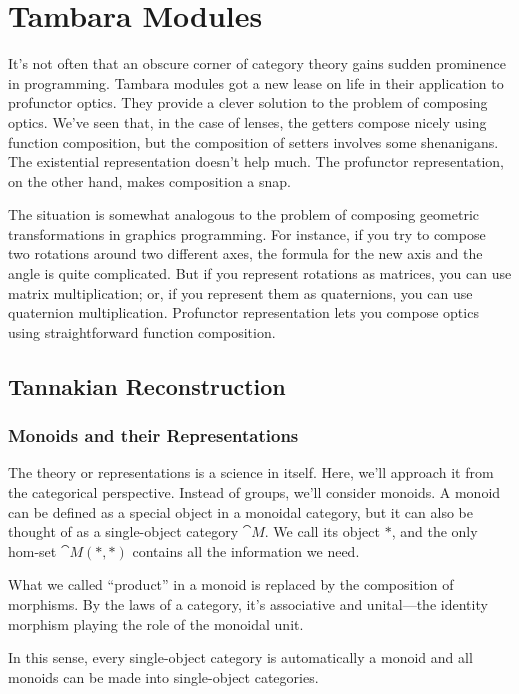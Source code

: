 \documentclass[DaoFP]{subfiles}
\begin{document}
\setcounter{chapter}{18}

\chapter{Tambara Modules}

It's not often that an obscure corner of category theory gains sudden prominence in programming. Tambara modules got a new lease on life in their application to profunctor optics. They provide a clever solution to the problem of composing optics. We've seen that, in the case of lenses, the getters compose nicely using function composition, but the composition of setters involves some shenanigans. The existential representation doesn't help much. The profunctor representation, on the other hand, makes composition a snap. 

The situation is somewhat analogous to the problem of composing geometric transformations in graphics programming. For instance, if you try to compose two rotations around two different axes, the formula for the new axis and the angle is quite complicated. But if you represent rotations as matrices, you can use matrix multiplication; or, if you represent them as quaternions, you can use quaternion multiplication. Profunctor representation lets you compose optics using straightforward function composition.


\section{Tannakian Reconstruction}

\subsection{Monoids and their Representations}

The theory or representations is a science in itself. Here, we'll approach it from the categorical perspective. Instead of groups, we'll consider monoids. A monoid can be defined as a special object in a monoidal category, but it can also be thought of as a single-object category $\cat M$. We call its object $*$, and the only hom-set $\cat M( *, *)$ contains all the information we need. 

What we called ``product'' in a monoid is replaced by the composition of morphisms. By the laws of a category, it's associative and unital---the identity morphism playing the role of the monoidal unit.

In this sense, every single-object category is automatically a monoid and all monoids can be made into single-object categories. 
\end{document}
